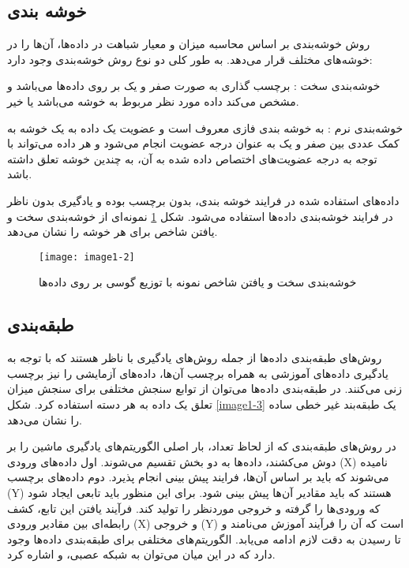 \subsection{ خوشه بندی }
روش خوشه‌بندی  بر اساس محاسبه میزان و معیار شباهت در داده‌ها، آن‌ها را در خوشه‌های مختلف قرار می‌دهد. به طور کلی دو نوع روش خوشه‌بندی وجود دارد:

\noindent
خوشه‌بندی سخت : برچسب گذاری به صورت صفر و یک بر روی داده‌ها می‌باشد و مشخص می‌كند داده مورد نظر مربوط به خوشه می‌باشد یا خیر.

\noindent
خوشه‌بندی نرم : به خوشه بندی فازی معروف است و عضویت یک داده به یک خوشه به کمک عددی بین صفر و یک به عنوان درجه عضویت انجام می‌شود و هر داده می‌تواند با توجه به درجه عضویت‌های اختصاص داده شده به آن، به چندین خوشه تعلق داشته باشد.

\noindent
داده‌های استفاده شده در فرایند خوشه بندی، بدون برچسب بوده و یادگیری بدون ناظر  در فرایند خوشه‌بندی داده‌ها استفاده می‌شود. شكل \ref{image1-2} نمونه‌ای از خوشه‌بندی سخت و یافتن شاخص برای هر خوشه را نشان می‌دهد.
\begin{figure}[!h]
\centering
\texttt{[image: image1-2]}
\caption{ خوشه‌بندی سخت و یافتن شاخص نمونه با توزیع گوسی بر روی داده‌ها }
\label{image1-2}
\end{figure}

\subsection{طبقه‌بندی}
روش‌های طبقه‌بندی  داده‌ها از جمله روش‌های یادگیری با ناظر  هستند که با توجه به یادگیری داده‌های آموزشی به همراه برچسب آن‌ها، داده‌های آزمایشی را نیز برچسب زنی می‌کنند. در طبقه‌بندی داده‌ها می‌توان از توابع سنجش مختلفی برای سنجش میزان تعلق یک داده به هر دسته استفاده کرد. شکل \ref{image1-3} یک طبقه‌بند غیر خطی ساده را نشان می‌دهد.

\noindent
در روش‌های طبقه‌بندی که از لحاظ تعداد، بار اصلی الگوریتم‌های یادگیری ماشین را بر دوش می‌کشند، داده‌ها به دو بخش تقسیم می‌شوند. اول داده‌های ورودی (X) نامیده می‌شوند که باید بر اساس آن‌ها، فرایند پیش بینی انجام پذیرد. دوم داده‌های برچسب (Y) هستند که باید مقادیر آن‌ها پیش بینی شود. برای این منظور باید تابعی ایجاد شود که ورودی‌ها را گرفته و خروجی موردنظر را تولید کند. فرآیند یافتن این تابع، کشف رابطه‌ای بین مقادیر ورودی (X) و خروجی (Y) است که آن را فرآیند آموزش می‌نامند و تا رسیدن به دقت لازم ادامه می‌یابد. الگوریتم‌های مختلفی برای طبقه‌بندی داده‌ها وجود دارد که در این میان می‌توان به شبکه عصبی،    و   اشاره کرد.

